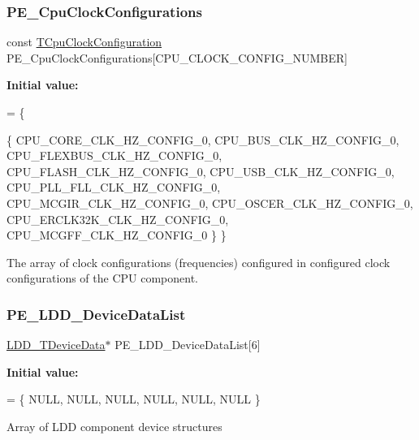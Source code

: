 \subsubsection{\texorpdfstring{P\+E\+\_\+\+Cpu\+Clock\+Configurations}{PE\_CpuClockConfigurations}}
{\footnotesize\ttfamily const \hyperlink{struct_t_cpu_clock_configuration}{T\+Cpu\+Clock\+Configuration} P\+E\+\_\+\+Cpu\+Clock\+Configurations\mbox{[}C\+P\+U\+\_\+\+C\+L\+O\+C\+K\+\_\+\+C\+O\+N\+F\+I\+G\+\_\+\+N\+U\+M\+B\+ER\mbox{]}}

{\bfseries Initial value\+:}
\begin{DoxyCode}
= \{
  
  \{
    CPU\_CORE\_CLK\_HZ\_CONFIG\_0,          
    CPU\_BUS\_CLK\_HZ\_CONFIG\_0,           
    CPU\_FLEXBUS\_CLK\_HZ\_CONFIG\_0,       
    CPU\_FLASH\_CLK\_HZ\_CONFIG\_0,         
    CPU\_USB\_CLK\_HZ\_CONFIG\_0,           
    CPU\_PLL\_FLL\_CLK\_HZ\_CONFIG\_0,       
    CPU\_MCGIR\_CLK\_HZ\_CONFIG\_0,         
    CPU\_OSCER\_CLK\_HZ\_CONFIG\_0,         
    CPU\_ERCLK32K\_CLK\_HZ\_CONFIG\_0,      
    CPU\_MCGFF\_CLK\_HZ\_CONFIG\_0          
  \}
\}
\end{DoxyCode}
The array of clock configurations (frequencies) configured in configured clock configurations of the C\+PU component. \mbox{\label{group___p_e___l_d_d__module_ga654c73169e3f1d8c3106e15497086517}} 
\subsubsection{\texorpdfstring{P\+E\+\_\+\+L\+D\+D\+\_\+\+Device\+Data\+List}{PE\_LDD\_DeviceDataList}}
{\footnotesize\ttfamily \hyperlink{group___p_e___types__module_gac5cf1362f1f0e3a2ce71b1bf2276d091}{L\+D\+D\+\_\+\+T\+Device\+Data}$\ast$ P\+E\+\_\+\+L\+D\+D\+\_\+\+Device\+Data\+List\mbox{[}6\mbox{]}}

{\bfseries Initial value\+:}
\begin{DoxyCode}
= \{
    NULL,
    NULL,
    NULL,
    NULL,
    NULL,
    NULL
  \}
\end{DoxyCode}
Array of L\+DD component device structures 